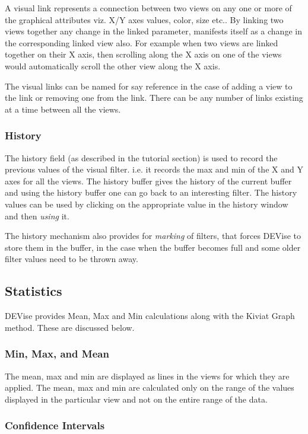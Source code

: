 A visual link represents a connection between two views on any one or more of the graphical  attributes viz. X/Y axes values, color, size etc.. By linking two views together any change in the linked parameter, manifests itself as a change in the corresponding linked view also. For example when two views are linked together on their X axis, then scrolling along the X axis on one of the views would automatically scroll the other view along the X axis. 

The visual links can be named for say reference in the case of adding a view to the link or removing one from the link. There can be any number of links existing at a time between all the views. 

\subsubsection{History}

The history field (as described in the tutorial section) is used to record the previous  values of the visual filter. i.e. it records the max and min of the X and Y axes for all the views. The history buffer gives the history of the current buffer and using the history buffer one can go back to an interesting filter. The history values can be used by clicking on the appropriate value in the history window and then {\em using } it.

The history mechanism also provides for {\em marking } of filters, that forces DEVise to store them in the buffer, in the case  when the buffer becomes full and some older filter values need to be thrown away.

\subsection{Statistics}

DEVise provides Mean, Max and Min calculations along with the Kiviat Graph method. These are discussed below.

\subsubsection{Min, Max, and Mean}

The mean, max and min are displayed as lines in the views for which they are applied. The mean, max and min  are calculated only on the range of the values displayed in the particular view and not on the entire range of the data.

\subsubsection{Confidence Intervals}

